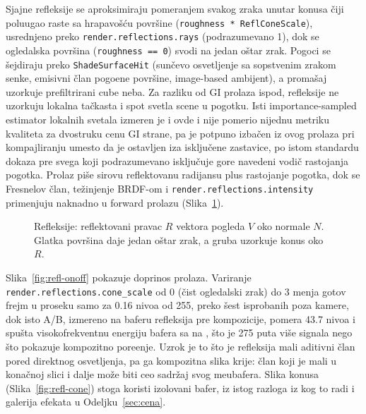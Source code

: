 Sjajne refleksije se aproksimiraju pomeranjem svakog zraka unutar konusa \v{c}iji poluugao raste sa hrapavo\v{s}\'cu povr\v{s}ine (\texttt{roughness * ReflConeScale}), usrednjeno preko \texttt{render.reflections.rays} (podrazumevano 1), dok se ogledalska povr\v{s}ina (\texttt{roughness == 0}) svodi na jedan o\v{s}tar zrak. Pogoci se \v{s}ejdiraju preko \texttt{ShadeSurfaceHit} (sun\v{c}evo osvetljenje sa sopstvenim zrakom senke, emisivni \v{c}lan pogo\dj{}ene povr\v{s}ine, image-based ambijent), a proma\v{s}aj uzorkuje prefiltrirani cube neba. Za razliku od GI prolaza ispod, refleksije ne uzorkuju lokalna ta\v{c}kasta i spot svetla scene u pogotku. Isti importance-sampled estimator lokalnih svetala izmeren je i ovde i nije pomerio nijednu metriku kvaliteta za dvostruku cenu GI strane, pa je potpuno izba\v{c}en iz ovog prolaza pri kompajliranju umesto da je ostavljen iza isklju\v{c}ene zastavice, po istom standardu dokaza pre svega koji podrazumevano isklju\v{c}uje gore navedeni vodi\v{c} rastojanja pogotka. Prolaz pi\v{s}e sirovu reflektovanu radijansu plus rastojanje pogotka, dok se Fresnelov \v{c}lan, te\v{z}injenje BRDF-om i \texttt{render.reflections.intensity} primenjuju naknadno u forward prolazu (Slika~\ref{fig:refl}).

\begin{figure}[tbp]
\centering
{}
\caption[Reflektovani pravac i konus hrapavosti]{Refleksije: reflektovani pravac $R$ vektora pogleda $V$ oko normale $N$. Glatka povr\v{s}ina daje jedan o\v{s}tar zrak, a gruba uzorkuje konus oko $R$.}
\label{fig:refl}
\end{figure}

Slika~\ref{fig:refl-onoff} pokazuje doprinos prolaza. Variranje \texttt{render.reflections.cone\_scale} od 0 (\v{c}ist ogledalski zrak) do 3 menja gotov frejm u proseku samo za 0.16 nivoa od 255, preko \v{s}est isprobanih poza kamere, dok isto A/B, izmereno na baferu refleksija pre kompozicije, pomera 43.7 nivoa i spu\v{s}ta visokofrekventnu energiju bafera sa \hfConeSharp{} na \hfConeGlossy{}, \v{s}to je 275 puta vi\v{s}e signala nego \v{s}to pokazuje kompozitno pore\dj{}enje. Uzrok je to \v{s}to je refleksija mali aditivni \v{c}lan pored direktnog osvetljenja, pa ga kompozitna slika krije: \v{c}lan koji je mali u kona\v{c}noj slici i dalje mo\v{z}e biti ceo sadr\v{z}aj svog me\dj{}ubafera. Slika konusa (Slika~\ref{fig:refl-cone}) stoga koristi izolovani bafer, iz istog razloga iz kog to radi i galerija efekata u Odeljku~\ref{sec:cena}.


